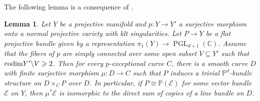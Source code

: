 \documentclass[english,reqno]{amsart}
\newcommand\bbC{{\mathbb C}}
\newcommand\bbP{{\mathbb P}}
\newcommand\sE{{\mathscr E}}
\newcommand{\codim}{{\rm codim}}
\DeclareMathOperator*{\PGL}{PGL}
\theoremstyle{plain}
\newtheorem{lemma}[thm]{Lemma}
\theoremstyle{definition}
\numberwithin{equation}{section} %
\begin{document}
The following lemma is a consequence of \cite[Theorem 1.5]{GrebKebekusPeternell2016b}.

\begin{lemma}\label{lemma:trivial-bundle-finite-change}
    Let $Y$ be a projective manifold and  $p \colon Y \to Y'$   a surjective morphism onto a normal projective variety with klt singularities. Let $P\rightarrow Y$ be a  flat projective bundle given by a representation $\pi_1(Y)\rightarrow \PGL_{d+1}(\bbC)$.
    Assume that the fibers of $p$ are simply connected over some open subset  $V\subseteq Y'$ such that $\codim Y'\backslash V \geqslant 2$.
    Then for every  $p$-exceptional curve $C$, there is a smooth   curve $D$ with finite surjective morphism $\mu \colon D \to C$ such that $P$ induces a trivial $\mathbb{P}^d$-bundle structure on $D \times_C P$ over $D$. In particular, if $P\cong \bbP(\sE)$ for some vector bundle $\sE$ on $Y$, then $\mu^*\sE$ is isomorphic to the direct sum of copies of a line bundle on $D$.
\end{lemma}
\end{document}
